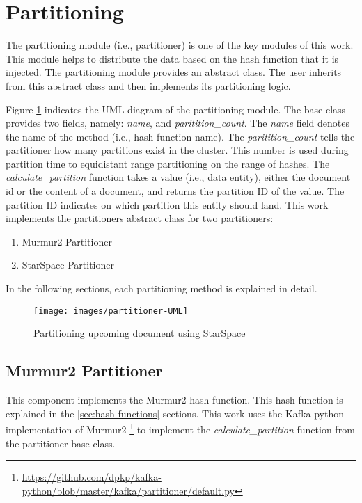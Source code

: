 \section{Partitioning}
\label{sec:partitioning}
The partitioning module (i.e., partitioner) is one of the key modules of this work. This module helps to distribute the data based on the hash function that it is injected. The partitioning module provides an abstract class. The user inherits from this abstract class and then implements its partitioning logic. 


Figure \ref{fig:partitioner-uml} indicates the UML diagram of the partitioning module. The base class provides two fields, namely: \emph{name}, and \emph{paritition\_count}. The \emph{name} field denotes the name of the method (i.e., hash function name). The \emph{paritition\_count} tells the partitioner how many partitions exist in the cluster. This number is used during partition time to equidistant range partitioning on the range of hashes. The \emph{calculate\_partition} function takes a value (i.e., data entity), either the document id or the content of a document, and returns the partition ID of the value. The partition ID indicates on which partition this entity should land. This work implements the partitioners abstract class for two partitioners:

\begin{enumerate}
    \item Murmur2 Partitioner
    \item StarSpace Partitioner
\end{enumerate}

In the following sections, each partitioning method is explained in detail.

\begin{figure}[!h]
    \centering
    \texttt{[image: images/partitioner-UML]}
    \caption{Partitioning upcoming document using StarSpace}
    \label{fig:partitioner-uml}
\end{figure}


\subsection{Murmur2 Partitioner}
\label{subsec:partitioning-murmur2}
This component implements the Murmur2 hash function. This hash function is explained in the \ref{sec:hash-functions} sections. This work uses the Kafka python implementation of Murmur2 \footnote{\url{https://github.com/dpkp/kafka-python/blob/master/kafka/partitioner/default.py}} to implement the \emph{calculate\_partition} function from the partitioner base class.

